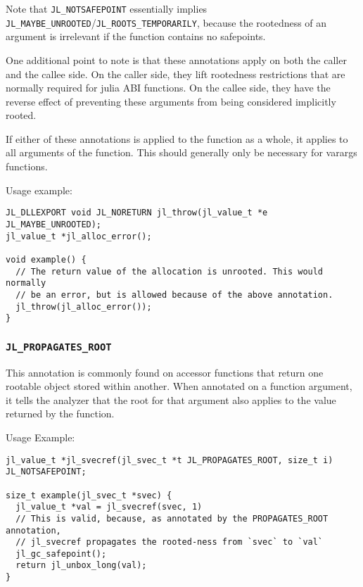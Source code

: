 Note that \texttt{JL\_NOTSAFEPOINT} essentially implies \texttt{JL\_MAYBE\_UNROOTED}/\texttt{JL\_ROOTS\_TEMPORARILY}, because the rootedness of an argument is irrelevant if the function contains no safepoints.



One additional point to note is that these annotations apply on both the caller and the callee side. On the caller side, they lift rootedness restrictions that are normally required for julia ABI functions. On the callee side, they have the reverse effect of preventing these arguments from being considered implicitly rooted.



If either of these annotations is applied to the function as a whole, it applies to all arguments of the function. This should generally only be necessary for varargs functions.



Usage example:




\begin{lstlisting}
JL_DLLEXPORT void JL_NORETURN jl_throw(jl_value_t *e JL_MAYBE_UNROOTED);
jl_value_t *jl_alloc_error();

void example() {
  // The return value of the allocation is unrooted. This would normally
  // be an error, but is allowed because of the above annotation.
  jl_throw(jl_alloc_error());
}
\end{lstlisting}



\hypertarget{8714501739065873603}{}


\subsubsection{\texttt{JL\_PROPAGATES\_ROOT}}



This annotation is commonly found on accessor functions that return one rootable object stored within another. When annotated on a function argument, it tells the analyzer that the root for that argument also applies to the value returned by the function.



Usage Example:




\begin{lstlisting}
jl_value_t *jl_svecref(jl_svec_t *t JL_PROPAGATES_ROOT, size_t i) JL_NOTSAFEPOINT;

size_t example(jl_svec_t *svec) {
  jl_value_t *val = jl_svecref(svec, 1)
  // This is valid, because, as annotated by the PROPAGATES_ROOT annotation,
  // jl_svecref propagates the rooted-ness from `svec` to `val`
  jl_gc_safepoint();
  return jl_unbox_long(val);
}
\end{lstlisting}



